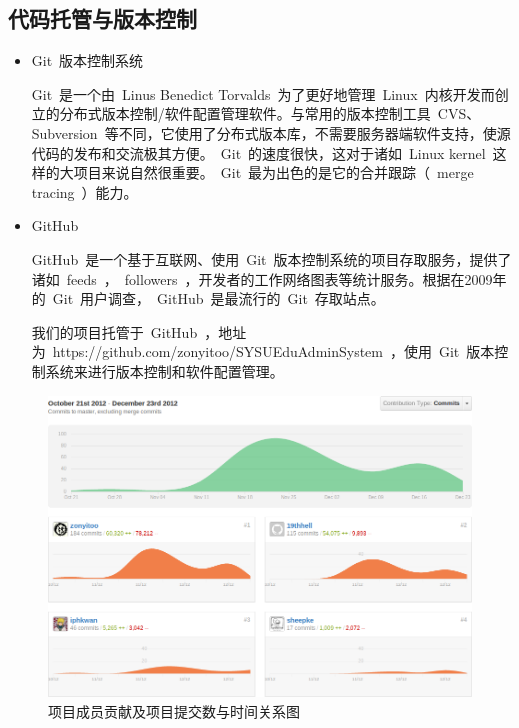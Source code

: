 
\subsection{代码托管与版本控制}
\begin{itemize}
  \item Git~版本控制系统
  
  \CJKindent Git~是一个由~Linus Benedict Torvalds~为了更好地管理~Linux~内核开发而创立的分布式版本控制/软件配置管理软件。与常用的版本控制工具~CVS、Subversion~等不同，它使用了分布式版本库，不需要服务器端软件支持，使源代码的发布和交流极其方便。~Git~的速度很快，这对于诸如~Linux kernel~这样的大项目来说自然很重要。~Git~最为出色的是它的合并跟踪（~merge tracing~）能力。
  
  \item GitHub
  
  \CJKindent GitHub~是一个基于互联网、使用~Git~版本控制系统的项目存取服务，提供了诸如~feeds~，~followers~，开发者的工作网络图表等统计服务。根据在2009年的~Git~用户调查，~GitHub~是最流行的~Git~存取站点。
  
  \CJKindent 我们的项目托管于~GitHub~，地址为~https://github.com/zonyitoo/SYSUEduAdminSystem~，使用~Git~版本控制系统来进行版本控制和软件配置管理。
\end{itemize}

\begin{figure}[H]
   \centering \includegraphics[width=\textwidth]{img/contrib.png}
   \caption{项目成员贡献及项目提交数与时间关系图}
\end{figure}

